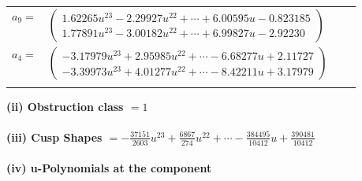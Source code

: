\documentclass[1p]{elsarticle_modified}
\theoremstyle{definition}
\begin{document}
\begin{tabular}{m{7pt} m{180pt} m{7pt} m{180pt} }
\flushright $a_{9}=$&$\begin{pmatrix}1.62265 u^{23}-2.29927 u^{22}+\cdots+6.00595 u-0.823185\\1.77891 u^{23}-3.00182 u^{22}+\cdots+6.99827 u-2.92230\end{pmatrix}$ \\
\flushright $a_{4}=$&$\begin{pmatrix}-3.17979 u^{23}+2.95985 u^{22}+\cdots-6.68277 u+2.11727\\-3.39973 u^{23}+4.01277 u^{22}+\cdots-8.42211 u+3.17979\end{pmatrix}$\\&\end{tabular}
\flushleft \textbf{(ii) Obstruction class $= 1$}\\~\\
\flushleft \textbf{(iii) Cusp Shapes $= -\frac{37151}{2603} u^{23}+\frac{6867}{274} u^{22}+\cdots-\frac{384495}{10412} u+\frac{390481}{10412}$}\\~\\
\newpage\renewcommand{\arraystretch}{1}
\flushleft \textbf{(iv) u-Polynomials at the component}\newline \\
\end{document}
